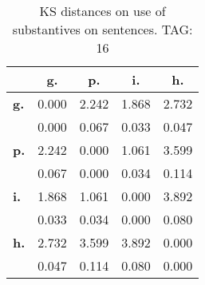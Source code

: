 \begin{table}[h!]
\begin{center}
\begin{tabular}{| l || c | c | c | c |}\hline
 & {\bf g.} & {\bf p.} & {\bf i.} & {\bf h.} \\\hline\hline
{\bf g.} & 0.000 & 2.242 & 1.868 & 2.732 \\
{\bf } & 0.000 & 0.067 & 0.033 & 0.047 \\\hline
{\bf p.} & 2.242 & 0.000 & 1.061 & 3.599 \\
{\bf } & 0.067 & 0.000 & 0.034 & 0.114 \\\hline
{\bf i.} & 1.868 & 1.061 & 0.000 & 3.892 \\
{\bf } & 0.033 & 0.034 & 0.000 & 0.080 \\\hline
{\bf h.} & 2.732 & 3.599 & 3.892 & 0.000 \\
{\bf } & 0.047 & 0.114 & 0.080 & 0.000 \\\hline
\end{tabular}
\caption{KS distances on use of substantives on sentences. TAG: 16}
\end{center}
\end{table}